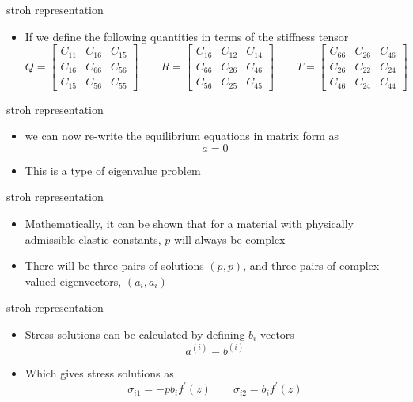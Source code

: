 \documentclass[
  letterpaper,
  ignorenonframetext,
  aspectratio=43,
  handout,
  12pt]{beamer}
\providecommand{\tightlist}{%
  \setlength{\itemsep}{0pt}\setlength{\parskip}{0pt}}
\providecommand{\tightlist}{%
\setlength{\itemsep}{0pt}\setlength{\parskip}{0pt}}
\begin{document}
\begin{frame}{stroh representation}
\protect\hypertarget{stroh-representation-3}{}
\begin{itemize}
\tightlist
\item
  If we define the following quantities in terms of the stiffness tensor
  \[Q = \begin{bmatrix}
    C_{11} & C_{16} & C_{15}\\
    C_{16} & C_{66} & C_{56}\\
    C_{15} & C_{56} & C_{55}
  \end{bmatrix} \qquad R = \begin{bmatrix}
    C_{16} & C_{12} & C_{14}\\
    C_{66} & C_{26} & C_{46}\\
    C_{56} & C_{25} & C_{45}
  \end{bmatrix} \qquad T = \begin{bmatrix}
    C_{66} & C_{26} & C_{46}\\
    C_{26} & C_{22} & C_{24}\\
    C_{46} & C_{24} & C_{44}
  \end{bmatrix}\]
\end{itemize}
\end{frame}

\begin{frame}{stroh representation}
\protect\hypertarget{stroh-representation-4}{}
\begin{itemize}
\item
  we can now re-write the equilibrium equations in matrix form as
  \[a=0\]
\item
  This is a type of eigenvalue problem
\end{itemize}
\end{frame}

\begin{frame}{stroh representation}
\protect\hypertarget{stroh-representation-5}{}
\begin{itemize}
\tightlist
\item
  Mathematically, it can be shown that for a material with physically
  admissible elastic constants, \(p\) will always be complex
\item
  There will be three pairs of solutions \((p,\bar{p})\), and three
  pairs of complex-valued eigenvectors, \((a_i,\bar{a_i})\)
\end{itemize}
\end{frame}

\begin{frame}{stroh representation}
\protect\hypertarget{stroh-representation-6}{}
\begin{itemize}
\item
  Stress solutions can be calculated by defining \(b_i\) vectors
  \[a^{(i)} = b^{(i)}\]
\item
  Which gives stress solutions as
  \[\sigma_{i1} = -pb_if^\prime(z) \qquad \sigma_{i2} = b_i f^\prime(z)\]
\end{itemize}
\end{frame}
\end{document}
